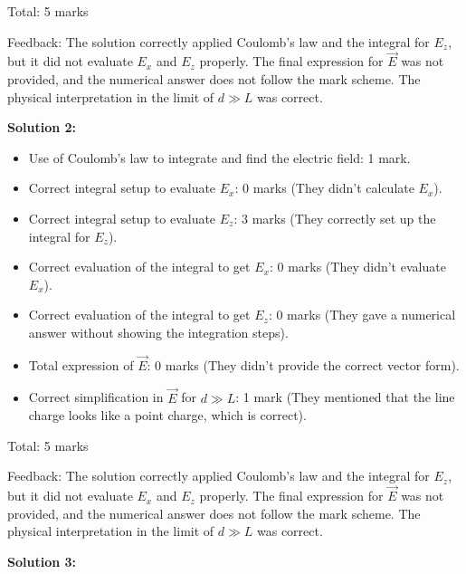 \documentclass[a4paper,11pt]{article}
\begin{document}
Total: 5 marks

Feedback: The solution correctly applied Coulomb's law and the integral for \( E_z \), but it did not evaluate \( E_x \) and \( E_z \) properly. The final expression for \( \vec{E} \) was not provided, and the numerical answer does not follow the mark scheme. The physical interpretation in the limit of \( d \gg L \) was correct.

\textbf{Solution 2:}

\begin{itemize}
  \item Use of Coulomb's law to integrate and find the electric field: 1 mark.
  \item Correct integral setup to evaluate \( E_x \): 0 marks (They didn't calculate \( E_x \)).
  \item Correct integral setup to evaluate \( E_z \): 3 marks (They correctly set up the integral for \( E_z \)).
  \item Correct evaluation of the integral to get \( E_x \): 0 marks (They didn't evaluate \( E_x \)).
  \item Correct evaluation of the integral to get \( E_z \): 0 marks (They gave a numerical answer without showing the integration steps).
  \item Total expression of \( \vec{E} \): 0 marks (They didn't provide the correct vector form).
  \item Correct simplification in \( \vec{E} \) for \( d \gg L \): 1 mark (They mentioned that the line charge looks like a point charge, which is correct).
\end{itemize}

Total: 5 marks

Feedback: The solution correctly applied Coulomb's law and the integral for \( E_z \), but it did not evaluate \( E_x \) and \( E_z \) properly. The final expression for \( \vec{E} \) was not provided, and the numerical answer does not follow the mark scheme. The physical interpretation in the limit of \( d \gg L \) was correct.

\textbf{Solution 3:}
\end{document}
